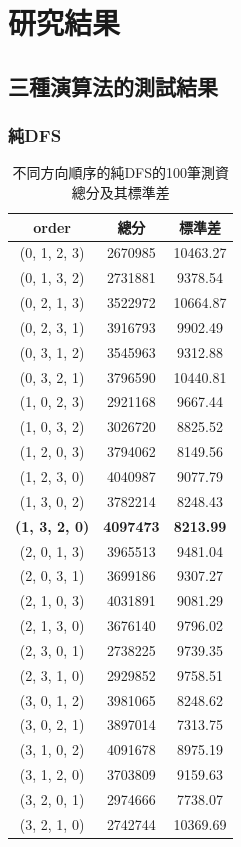 \documentclass[12pt, a4paper]{article}
\begin{document}
\section{研究結果}
\subsection{三種演算法的測試結果}
\subsubsection{純DFS}
\begin{table}[H]
\caption{不同方向順序的純DFS的100筆測資總分及其標準差}
\label{tab:my-table}
\centering
\begin{tabular}{@{}ccc@{}}
\toprule
\textbf{order} & \textbf{總分} & \textbf{標準差} \\ \midrule
(0, 1, 2, 3)   & 2670985     & 10463.27     \\
(0, 1, 3, 2)   & 2731881     & 9378.54      \\
(0, 2, 1, 3)   & 3522972     & 10664.87     \\
(0, 2, 3, 1)   & 3916793     & 9902.49      \\
(0, 3, 1, 2)   & 3545963     & 9312.88      \\
(0, 3, 2, 1)   & 3796590     & 10440.81     \\
(1, 0, 2, 3)   & 2921168     & 9667.44      \\
(1, 0, 3, 2)   & 3026720     & 8825.52      \\
(1, 2, 0, 3)   & 3794062     & 8149.56      \\
(1, 2, 3, 0)   & 4040987     & 9077.79      \\
(1, 3, 0, 2)   & 3782214     & 8248.43      \\
\textbf{(1, 3, 2, 0)}   & \textbf{4097473}     & \textbf{8213.99}      \\
(2, 0, 1, 3)   & 3965513     & 9481.04      \\
(2, 0, 3, 1)   & 3699186     & 9307.27      \\
(2, 1, 0, 3)   & 4031891     & 9081.29      \\
(2, 1, 3, 0)   & 3676140     & 9796.02      \\
(2, 3, 0, 1)   & 2738225     & 9739.35      \\
(2, 3, 1, 0)   & 2929852     & 9758.51      \\
(3, 0, 1, 2)   & 3981065     & 8248.62      \\
(3, 0, 2, 1)   & 3897014     & 7313.75      \\
(3, 1, 0, 2)   & 4091678     & 8975.19      \\
(3, 1, 2, 0)   & 3703809     & 9159.63      \\
(3, 2, 0, 1)   & 2974666     & 7738.07      \\
(3, 2, 1, 0)   & 2742744     & 10369.69     \\ \bottomrule
\end{tabular}
\end{table}
\end{document}
